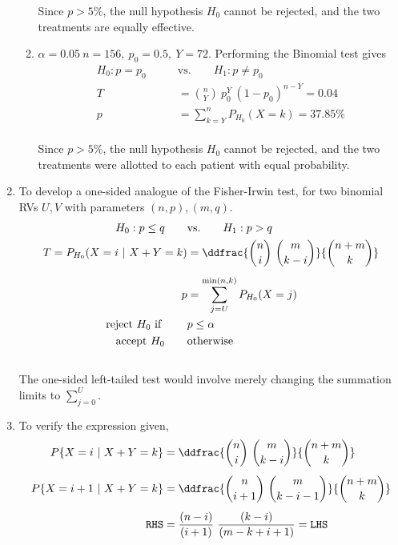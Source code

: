 \begin{enumerate}
\begin{enumerate}
		Since $ p > 5\% $, the null hypothesis $ H_0 $ cannot be rejected, and the two treatments are equally effective.\\
		
	
		\item $\alpha = 0.05\ n = 156,\ p_0 = 0.5,\ Y = 72$. Performing the Binomial test gives\\
		
		\begin{align}
			H_0 : p = p_0 \qquad &\text{vs.} \qquad H_1 : p \neq p_0 \nonumber \\
			T &= \binom{n}{Y}\ p_0^Y\ (1-p_0)^{n-Y}  = 0.04 \nonumber \\
			p &= \sum\limits_{k = Y}^{n} P_{H_0}(X = k) = 37.85\%
		\end{align}\\
	
		Since $ p > 5\% $, the null hypothesis $ H_0 $ cannot be rejected, and the two treatments were allotted to each patient with equal probability.\\
	\end{enumerate}

	\item To develop a one-sided analogue of the Fisher-Irwin test, for two binomial RVs $ U, V $ with parameters $ (n, p) , (m, q)$.\\
	\begin{align}
		H_0 : p \leq q \qquad &\text{vs.} \qquad H_1 : p > q \nonumber \\
		T = P_{H_0}(X = i\ |\ X+Y = k) &= \ddfrac{\binom{n}{i}\ \binom{m}{k-i}}{\binom{n+m}{k}} \nonumber \\[1ex]
		p &= \sum\limits_{j = U}^{\min(n, k)} P_{H_0}(X = j) \nonumber \\
		\text{reject $ H_0 $ if } \qquad & p \leq \alpha  \nonumber \\
		\text{accept $ H_0 $} \qquad & \text{otherwise} \nonumber \\
	\end{align}\\
	
	The one-sided left-tailed test would involve merely changing the summation limits to $ \sum\limits_{j = 0}^{U} $.
	
	\item To verify the expression given,\\
	\begin{align}
		P\{X = i\ |\ X+Y = k\} &= \ddfrac{\binom{n}{i}\ \binom{m}{k-i}}{\binom{n+m}{k}}  \\[1ex]
		P\{X = i+1\ |\ X+Y = k\} &= \ddfrac{\binom{n}{i+1}\ \binom{m}{k-i-1}}{\binom{n+m}{k}} \nonumber \\[1ex]
		\texttt{RHS} &= \frac{(n-i)}{(i+1)} \ \frac{(k-i)}{(m-k+i+1)} = \texttt{LHS}
	\end{align}\\


\end{enumerate}
